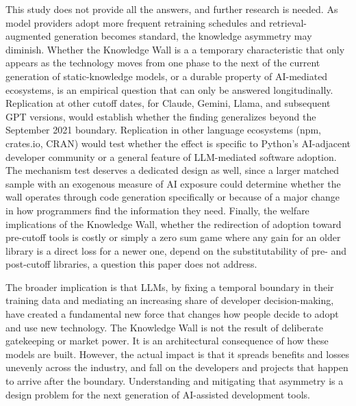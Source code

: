\documentclass[12pt, a4paper]{report}
\begin{document}
This study does not provide all the answers, and further research is needed. As model providers adopt more frequent retraining schedules and retrieval-augmented generation becomes standard, the knowledge asymmetry may diminish. Whether the Knowledge Wall is a a temporary characteristic that only appears as the technology moves from one phase to the next of the current generation of static-knowledge models, or a durable property of AI-mediated ecosystems, is an empirical question that can only be answered longitudinally. Replication at other cutoff dates, for Claude, Gemini, Llama, and subsequent GPT versions, would establish whether the finding generalizes beyond the September 2021 boundary. Replication in other language ecosystems (npm, crates.io, CRAN) would test whether the effect is specific to Python's AI-adjacent developer community or a general feature of LLM-mediated software adoption. The mechanism test deserves a dedicated design as well, since a larger matched sample with an exogenous measure of AI exposure could determine whether the wall operates through code generation specifically or because of a major change in how programmers find the information they need. Finally, the welfare implications of the Knowledge Wall, whether the redirection of adoption toward pre-cutoff tools is costly or simply a zero sum game where any gain for an older library is a direct loss for a newer one, depend on the substitutability of pre- and post-cutoff libraries, a question this paper does not address.

The broader implication is that LLMs, by fixing a temporal boundary in their training data and mediating an increasing share of developer decision-making, have created a fundamental new force that changes how people decide to adopt and use new technology. The Knowledge Wall is not the result of deliberate gatekeeping or market power. It is an architectural consequence of how these models are built. However, the actual impact is that it spreads benefits and losses unevenly across the industry, and fall on the developers and projects that happen to arrive after the boundary. Understanding and mitigating that asymmetry is a design problem for the next generation of AI-assisted development tools.




\appendix
\renewcommand{\chaptername}{Appendix}
\titleformat{\chapter}[hang]{\bfseries\Large}{\chaptername\ \thechapter\ --\ }{0pt}{}
\titlespacing*{\chapter}{0pt}{-20pt}{20pt}
\end{document}
